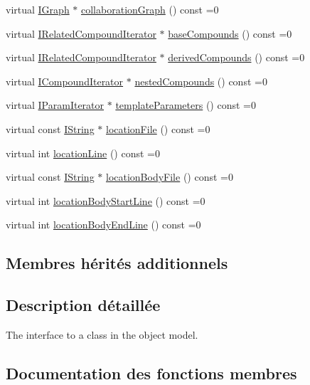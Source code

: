 \begin{DoxyCompactItemize}
virtual \hyperlink{class_i_graph}{I\+Graph} $\ast$ \hyperlink{class_i_class_a9a4868aa1725ff40c25df37a61236db1}{collaboration\+Graph} () const  =0
\item 
virtual \hyperlink{class_i_related_compound_iterator}{I\+Related\+Compound\+Iterator} $\ast$ \hyperlink{class_i_class_a465dcb947012a4cf59cde116115bc555}{base\+Compounds} () const  =0
\item 
virtual \hyperlink{class_i_related_compound_iterator}{I\+Related\+Compound\+Iterator} $\ast$ \hyperlink{class_i_class_afa3794f4cf39dd6bf27b4ca76e23c377}{derived\+Compounds} () const  =0
\item 
virtual \hyperlink{class_i_compound_iterator}{I\+Compound\+Iterator} $\ast$ \hyperlink{class_i_class_a12ee5cafae5e1f824873fccc2557d459}{nested\+Compounds} () const  =0
\item 
virtual \hyperlink{class_i_param_iterator}{I\+Param\+Iterator} $\ast$ \hyperlink{class_i_class_a14c81b112428058413984710bd3427dc}{template\+Parameters} () const  =0
\item 
virtual const \hyperlink{class_i_string}{I\+String} $\ast$ \hyperlink{class_i_class_a0a90ef5e6c12fc733c5ee48a2bc492a3}{location\+File} () const  =0
\item 
virtual int \hyperlink{class_i_class_a464256b65645ff2f66c709f12352ade9}{location\+Line} () const  =0
\item 
virtual const \hyperlink{class_i_string}{I\+String} $\ast$ \hyperlink{class_i_class_aa942dacee208e9e852ef8071c6e913ba}{location\+Body\+File} () const  =0
\item 
virtual int \hyperlink{class_i_class_a8a18f4c67d2e9ec0fb4574f1ca7dfc42}{location\+Body\+Start\+Line} () const  =0
\item 
virtual int \hyperlink{class_i_class_a1d79134da2a3b490b205037ff677084e}{location\+Body\+End\+Line} () const  =0
\end{DoxyCompactItemize}
\subsection*{Membres hérités additionnels}


\subsection{Description détaillée}
The interface to a class in the object model. 

\subsection{Documentation des fonctions membres}
\hypertarget{class_i_class_a465dcb947012a4cf59cde116115bc555}{}
